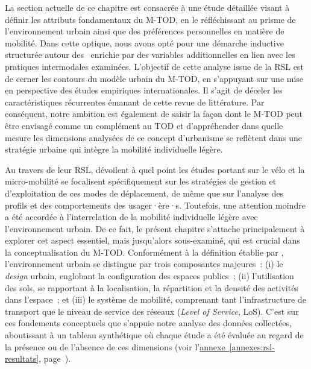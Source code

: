 \begin{refsegment}
La section actuelle de ce chapitre est consacrée à une étude détaillée visant à définir les attributs fondamentaux du \acrshort{M-TOD}, en le réfléchissant au prisme de l'environnement urbain ainsi que des préférences personnelles en matière de mobilité. Dans cette optique, nous avons opté pour une démarche inductive structurée autour des ~enrichie par des variables additionnelles en lien avec les pratiques intermodales examinées. L'objectif de cette analyse issue de la \acrshort{RSL} est de cerner les contours du modèle urbain du \acrshort{M-TOD}, en s'appuyant sur une mise en perspective des études empiriques internationales. Il s'agit de déceler les caractéristiques récurrentes émanant de cette revue de littérature. Par conséquent, notre ambition est également de saisir la façon dont le \acrshort{M-TOD} peut être envisagé comme un complément au \acrshort{TOD} et d'appréhender dans quelle mesure les dimensions analysées de ce concept d'urbanisme se reflètent dans une stratégie urbaine qui intègre la mobilité individuelle légère.%

Au travers de leur \acrshort{RSL}, \textcolor{blue}{\textcite[294]{zhang_built_2023}} dévoilent à quel point les études portant sur le vélo et la micro-mobilité se focalisent spécifiquement sur les stratégies de gestion et d'exploitation de ces modes de déplacement, de même que sur l'analyse des profils et des comportements des usager·ère·s. Toutefois, une attention moindre a été accordée à l'interrelation de la mobilité individuelle légère avec l'environnement urbain. De ce fait, le présent chapitre s'attache principalement à explorer cet aspect essentiel, mais jusqu'alors sous-examiné, qui est crucial dans la conceptualisation du \acrshort{M-TOD}. Conformément à la définition établie par \textcolor{blue}{\textcite[65]{handy_how_2002}}, l'environnement urbain se distingue par trois composantes majeures~: (i) le \textsl{design} urbain, englobant la configuration des espaces publics~; (ii) l'utilisation des sols, se rapportant à la localisation, la répartition et la densité des activités dans l'espace~; et (iii) le système de mobilité, comprenant tant l'infrastructure de transport que le niveau de service des réseaux (\textsl{Level of Service}, LoS). C'est sur ces fondements conceptuels que s'appuie notre analyse des données collectées, aboutissant à un tableau synthétique où chaque étude a été évaluée au regard de la présence ou de l'absence de ces dimensions (voir l'\hyperref[annexes:rsl-resultats]{annexe~\ref{annexes:rsl-resultats}}, page~\pageref{annexes:rsl-resultats}).%


\end{refsegment}
